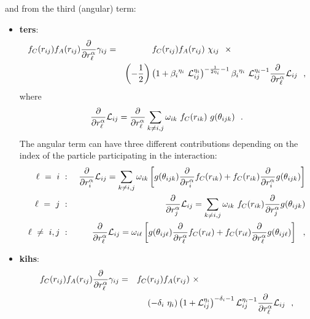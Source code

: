 and from the third (angular) term:
\begin{itemize}
\item {\bf ters}:
\begin{eqnarray}
f_{C}(r_{ij}) f_{A}(r_{ij}) \frac{\partial}{\partial r_{\ell}^{\alpha}} \gamma_{ij}&=&
f_{C}(r_{ij}) f_{A}(r_{ij})~\chi_{ij}~~\times ~~~~~~~~~~~~~~~~~~~~~~~~~~ \nonumber \\
& & \left( -\frac{1}{2} \right) \left( 1 + {\beta_{i}}^{\eta_{i}}~{\cal{L}}_{ij}^{\eta_{i}}
\right)^{-\frac{1}{2 \eta_{i}} - 1} {\beta_{i}}^{\eta_{i}}~{\cal{L}}_{ij}^{\eta_{i}-1}
\frac{\partial}{\partial r_{\ell}^{\alpha}} {\cal{L}}_{ij}~~,
\end{eqnarray}
where
\begin{equation}
\frac{\partial}{\partial r_{\ell}^{\alpha}} {\cal{L}}_{ij} =
\frac{\partial}{\partial r_{\ell}^{\alpha}} \sum_{k \neq i,j}
\omega_{ik}~f_{C}(r_{ik})~g(\theta_{ijk})~~.  \nonumber
\end{equation}
The angular term can have three different contributions depending
on the index of the particle participating in the interaction:
\begin{eqnarray}
\ell~=~i~&:&~\frac{\partial}{\partial r_{i}^{\alpha}} {\cal{L}}_{ij} = \sum_{k \neq i,j} \omega_{ik}
\left[ g(\theta_{ijk}) \frac{\partial}{\partial r_{i}^{\alpha}} f_{C}(r_{ik}) +
f_{C}(r_{ik}) \frac{\partial}{\partial r_{i}^{\alpha}} g(\theta_{ijk}) \right] \nonumber \\
\ell~=~j~&:&~\frac{\partial}{\partial r_{j}^{\alpha}} {\cal{L}}_{ij} = \sum_{k \neq i,j} \omega_{ik}
~f_{C}(r_{ik}) \frac{\partial}{\partial r_{j}^{\alpha}} g(\theta_{ijk}) \\
\ell~\neq~i,j~&:&~\frac{\partial}{\partial r_{\ell}^{\alpha}} {\cal{L}}_{ij} = \omega_{i \ell}
\left[ g(\theta_{ij \ell}) \frac{\partial}{\partial r_{\ell}^{\alpha}} f_{C}(r_{i \ell}) +
f_{C}(r_{i \ell}) \frac{\partial}{\partial r_{\ell}^{\alpha}} g(\theta_{ij \ell}) \right]~~, \nonumber
\end{eqnarray}
\item {\bf kihs}:
\begin{eqnarray}
f_{C}(r_{ij}) f_{A}(r_{ij}) \frac{\partial}{\partial r_{\ell}^{\alpha}} \gamma_{ij}&=&
f_{C}(r_{ij}) f_{A}(r_{ij})~\times ~~~~~~~~~~~~~~~~~~~~~~~~~~~~~~~~~ \nonumber \\
& & \left(-\delta_{i}~\eta_{i}\right) \left( 1 + {\cal{L}}_{ij}^{\eta_{i}}\right)^{-\delta_{i} - 1}
{\cal{L}}_{ij}^{\eta_{i}-1} \frac{\partial}{\partial r_{\ell}^{\alpha}} {\cal{L}}_{ij}~~,
\end{eqnarray}

\end{itemize}
